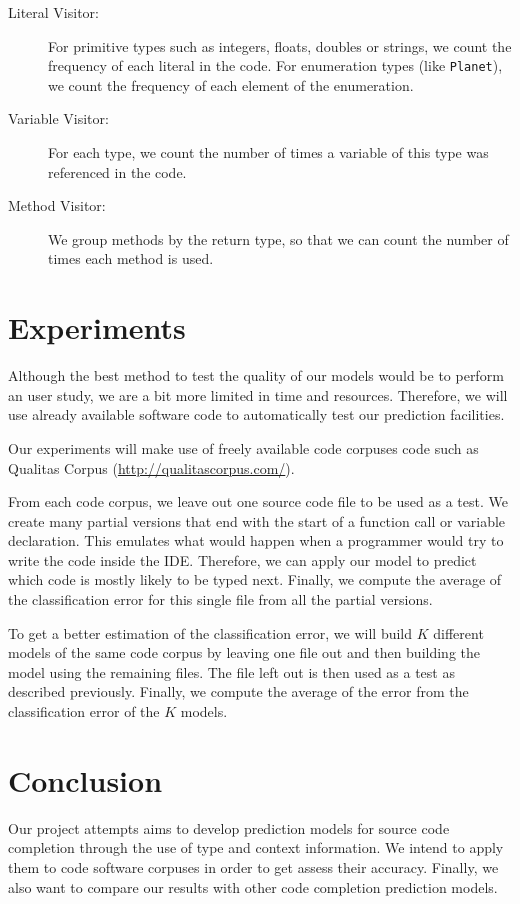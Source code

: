 \documentclass{article} %
\begin{document}
\begin{description}
   \item[Literal Visitor:] For primitive types such as integers, floats, doubles or strings, we count the frequency of each literal in the code. For enumeration types (like \texttt{Planet}), we count the frequency of each element of the enumeration.

   \item[Variable Visitor:] For each type, we count the number of times a variable of this type was referenced in the code.

   \item[Method Visitor:] We group methods by the return type, so that we can count the number of times each method is used.
\end{description}

\section*{Experiments}

Although the best method to test the quality of our models would be to perform an user study, we are a bit more limited in time and resources. Therefore, we will use already available software code to automatically test our prediction facilities.

Our experiments will make use of freely available code corpuses code such as Qualitas Corpus (\url{http://qualitascorpus.com/}).

From each code corpus, we leave out one source code file to be used as a test.
We create many partial versions that end with the start of a function call or variable declaration. This emulates what would happen when a programmer would try to write the code inside the IDE. Therefore, we can apply our model to predict which code is mostly likely to be typed next. Finally, we compute the average of the classification error for this single file from all the partial versions.

To get a better estimation of the classification error, we will build $K$ different models of the same code corpus by leaving one file out and then building the model using the remaining files. The file left out is then used as a test as described previously. Finally, we compute the average of the error from the classification error of the $K$ models.

\section*{Conclusion}

Our project attempts aims to develop prediction models for source code completion through the use of type and context information. We intend to apply them to code software corpuses in order to get assess their accuracy. Finally, we also want to compare our results with other code completion prediction models.



\end{document}

